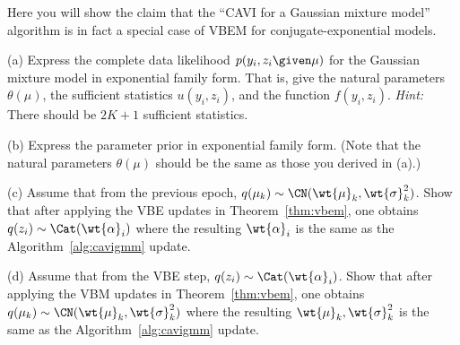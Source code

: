 \documentclass{article}
\begin{document}
\begin{exercise}
Here you will show the claim that the ``CAVI for a Gaussian mixture model'' algorithm is in fact a special case of VBEM for conjugate-exponential models.

(a) Express the complete data likelihood $p(y_i, z_i \given \mu)$ for the Gaussian mixture model in exponential family form. That is, give the natural parameters $\theta(\mu)$, the sufficient statistics $u(y_i, z_i)$, and the function $f(y_i, z_i)$. \emph{Hint:} There should be $2K+1$ sufficient statistics.

(b) Express the parameter prior in exponential family form. (Note that the natural parameters $\theta(\mu)$ should be the same as those you derived in (a).)

(c) Assume that from the previous epoch, $q(\mu_k) \sim \CN(\wt{\mu}_k, \wt{\sigma}^2_k)$. Show that after applying the VBE updates in Theorem~\ref{thm:vbem}, one obtains $q(z_i) \sim \Cat(\wt{\alpha}_i)$ where the resulting $\wt{\alpha}_i$ is the same as the Algorithm~\ref{alg:cavigmm} update.

(d) Assume that from the VBE step, $q(z_i) \sim \Cat(\wt{\alpha}_i)$. Show that after applying the VBM updates in Theorem~\ref{thm:vbem}, one obtains $q(\mu_k) \sim \CN(\wt{\mu}_k, \wt{\sigma}^2_k)$ where the resulting $\wt{\mu}_k, \wt{\sigma}^2_k$ is the same as the Algorithm~\ref{alg:cavigmm} update.
\end{exercise}
\end{document}
